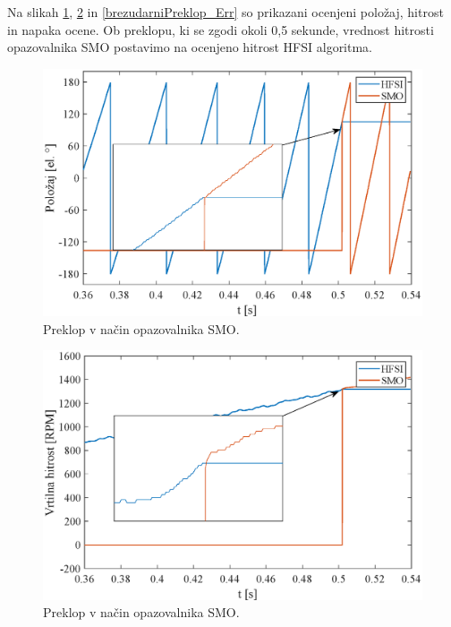 \documentclass[a4paper,twoside,openright,12pt,slovene]{book}
\begin{document}
Na slikah \ref{brezudarniPreklop_Pos}, \ref{brezudarniPreklop_Speed} in \ref{brezudarniPreklop_Err} so prikazani ocenjeni položaj, hitrost in napaka ocene. Ob preklopu, ki se zgodi okoli 0,5 sekunde,
vrednost hitrosti opazovalnika SMO postavimo na ocenjeno hitrost HFSI algoritma.

\begin{figure}[!htbp]
    \centering
    \includegraphics[width=0.99\columnwidth]{Slike/brezudarniPreklop_Pos.eps}
    \caption{\label{brezudarniPreklop_Pos} Preklop v način opazovalnika SMO. }
\end{figure}

\begin{figure}[!htbp]
    \centering
    \includegraphics[width=0.99\columnwidth]{Slike/brezudarniPreklop_Speed.eps}
    \caption{\label{brezudarniPreklop_Speed} Preklop v način opazovalnika SMO. }
\end{figure}
\end{document}
